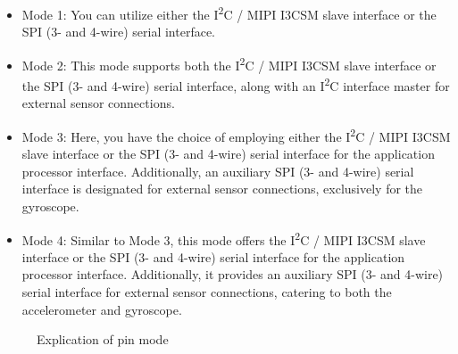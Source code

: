 \begin{itemize}
	\item Mode 1: You can utilize either the I\textsuperscript{2}C / MIPI I3CSM slave interface or the SPI (3- and 4-wire) serial interface.
	
	\item Mode 2: This mode supports both the I\textsuperscript{2}C / MIPI I3CSM slave interface or the SPI (3- and 4-wire) serial interface, along with an I\textsuperscript{2}C interface master for external sensor connections.
	
	\item Mode 3: Here, you have the choice of employing either the I\textsuperscript{2}C / MIPI I3CSM slave interface or the SPI (3- and 4-wire) serial interface for the application processor interface. Additionally, an auxiliary SPI (3- and 4-wire) serial interface is designated for external sensor connections, exclusively for the gyroscope.
	
	\item Mode 4: Similar to Mode 3, this mode offers the I\textsuperscript{2}C / MIPI I3CSM slave interface or the SPI (3- and 4-wire) serial interface for the application processor interface. Additionally, it provides an auxiliary SPI (3- and 4-wire) serial interface for external sensor connections, catering to both the accelerometer and gyroscope.	
	
\end{itemize}

\begin{figure}[H]
	\begin{center}
		\caption{Explication of pin mode}  
	\end{center}
\end{figure}

